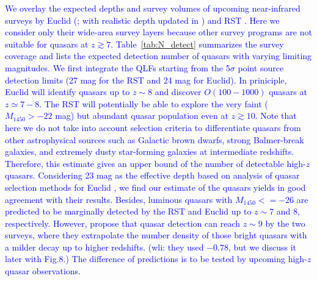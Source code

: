 \documentclass[twocolumn, twocolappendix]{aastex63}
\newcommand{\Muv}{M_{1450}}
\newcommand{\blue}[1]{\textcolor{blue}{ #1}}
\begin{document}
\begin{CJK*}{UTF8}{gbsn}
\blue{
We overlay the expected depths and survey volumes of upcoming near-infrared surveys by
Euclid (\citealt{2011arXiv1110.3193L}; with realistic depth updated in \citealt{2019Barnett}) and RST \citep{2019arXiv190205569A}.
Here we consider only their wide-area survey layers because other survey programs are not suitable for quasars at $z\gtrsim 7$.
Table~\ref{tab:N_detect} summarizes the survey coverage and lists the expected detection number of quasars with varying limiting magnitudes.
We first integrate the QLFs starting from the 5$\sigma$ point source detection limits (27 mag for the RST and 24 mag for Euclid).
In priniciple, Euclid will identify quasars up to $z\sim 8$ and discover $O(100-1000)$ quasars at $z\simeq 7-8$.
The RST will potentially be able to explore the very faint ($\Muv>-22$ mag) but abundant quasar population even at $z\gtrsim 10$. 
Note that here we do not take into account selection criteria to differentiate quasars from other astrophysical sources such
as Galactic brown dwarfs, strong Balmer-break galaxies, and extremely dusty star-forming galaxies at intermediate redshifts.
Therefore, this estimate gives an upper bound of the number of detectable high-$z$ quasars.
Considering 23 mag as the effective depth based on analysis of quasar selection methods for Euclid \citep{2019Barnett},
we find our estimate of the quasars yields in good agreement with their results.
Besides, luminous quasars with $\Muv<=-26$ are predicted to be marginally detected by the RST and Euclid up to $z\sim 7$ and 8, respectively.
However, \citet{2019BAAS...51c.121F} propose that quasar detection can reach $z\sim 9$ by the two surveys,
where they extrapolate the number density of those bright quasars with a milder decay up to higher redshifts. (wli: they used $-0.78$, but we discuss it later with Fig.8.)
The difference of predictions is to be tested by upcoming high-$z$ quasar observations.
}




\end{CJK*}
\end{document}
